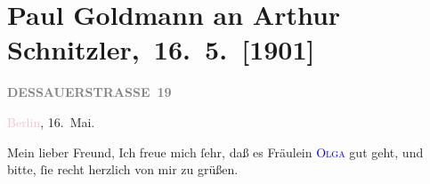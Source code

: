 

\renewcommand{\erwaehntePersonen}{Personen: Felix Salten, Olga Schnitzler, Irene Triesch}
\renewcommand{\erwaehnteInstitutionen}{Institutionen: Akademischer Verein für Kunst und Literatur, Jung-Wiener Theater zum Lieben Augustin}
\renewcommand{\erwaehnteOrte}{Orte: Berlin, Dessauer Straße, Wien}
\renewcommand{\erwaehnteWerke}{Werke: Der Schleier der Beatrice. Schauspiel in fünf Akten}
\section[ Paul Goldmann an Arthur Schnitzler, 16. 5. {[}1901{]}]{Paul Goldmann an Arthur Schnitzler, 16. 5. {[}1901{]}}
\nopagebreak{}
\rehead{ }\normalsize\beginnumbering{}
\toendnotes[C]{\smallbreak\pagebreak[2]}
\toendnotes[C]{\smallbreak}
\pstart
           \noindent{}\raggedleft{}{\pb}\textcolor{pink}{\textcolor{gray}{\textbf{DESSAUERSTRASSE 19}}}{}\ledrightnote{\textcolor{pink}{Dessauer Straße}}\pend
           
\pstart
           \textcolor{pink}{Berlin}{}\ledrightnote{\textcolor{pink}{Berlin}}, 16. Mai.\pend
           
\pstart\center{}Mein lieber Freund,\pend
\pstart
           Ich freue mich ſehr, daß es Fräulein \textsc{\textcolor{blue}{Olga}{}\ledrightnote{\textcolor{blue}{Olga Schnitzler}}} gut geht, und bitte, ſie recht herzlich von mir zu grüßen.\pend
           
